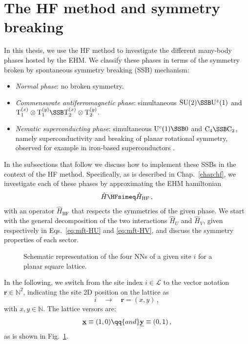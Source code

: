 \section{The HF method and symmetry breaking}\label{sec:ehm-sym-break}

In this thesis, we use the HF method to investigate the different many-body phases hosted by the EHM. We classify these phases in terms of the symmetry broken by spontaneous symmetry breaking (SSB) mechanism:
\begin{itemize}
	\item \textit{Normal phase}: no broken symmetry.
	\item \textit{Commensurate antiferromagnetic phase}: simultaneous $\mathrm{SU}(2) \SSB \mathrm{U}^z(1)$ and $\mathrm{T}_1^{(x)} \otimes \mathrm{T}_1^{(y)} \SSB \mathrm{T}_2^{(x)} \otimes \mathrm{T}_2^{(y)}$.
	\item \textit{Nematic superconducting phase}: simultaneous $\mathrm{U}^c(1) \SSB 0$ and $\mathrm{C}_4 \SSB \mathrm{C}_2$, namely superconductivity and breaking of planar rotational symmetry, observed for example in iron-based superconductors \cite{bohmer2022nematicity}.
\end{itemize}
In the subsections that follow we discuss how to implement these SSBs in the context of the HF method. Specifically, as is described in Chap.~\ref{chap:hf}, we investigate each of these phases by approximating the EHM hamiltonian 
\[
	\hat H \HFsimeq \hat H_\mathrm{HF} \, ,
\]
with an operator $\hat H_\mathrm{HF}$ that respects the symmetries of the given phase. We start with the general decomposition of the two interactions $\hat H_U$ and $\hat H_V$, given respectively in Eqs.~\eqref{eq:mft-HU} and \eqref{eq:mft-HV}, and discuss the symmetry properties of each sector.

\begin{figure}
	\centering
	
	\caption{Schematic representation of the four NNs of a given site $i$ for a planar square lattice.}
	\label{fig:square-nearest-neighbors}
\end{figure}

In the following, we switch from the site index $i \in \mathcal{L}$ to the vector notation $\mathbf{r} \in \mathbb{N}^2$, indicating the site 2D position on the lattice as
\[
	i \quad\to\quad \mathbf{r} = (x,y) \, ,
\]
with $x,y \in \mathbb{N}$. The lattice versors are:
\[
	\underline{\mathbf{x}} \equiv (1,0)
	\qq{and}
	\underline{\mathbf{y}} \equiv (0,1) \, ,
\]
as is shown in Fig.~\ref{fig:square-nearest-neighbors}.

